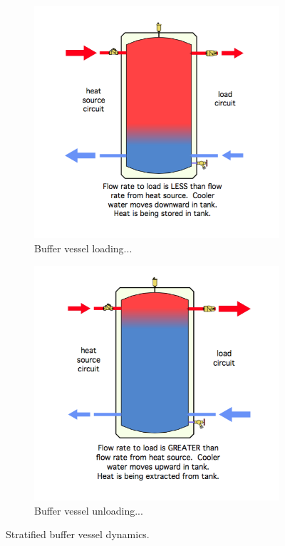 \begin{figure}[H]
	\centering
	\begin{subfigure}[b]{0.45\textwidth}
		\includegraphics[width=\textwidth]{Figures/4-way buffer loaded}
		\caption{Buffer vessel loading...}
		\label{fig:4way_loaded}
	\end{subfigure}
	\hfill
	\begin{subfigure}[b]{0.45\textwidth}
		\includegraphics[width=\textwidth]{Figures/4-way buffer unloading}
		\caption{Buffer vessel unloading...}
		\label{fig:4way_unloading}
	\end{subfigure}
	\caption{Stratified buffer vessel dynamics.}
	\label{fig:4way_dynamics}
\end{figure}

